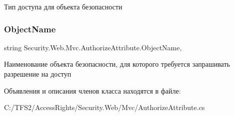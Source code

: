 Тип доступа для объекта безопасности 

\mbox{\label{class_security_1_1_web_1_1_mvc_1_1_authorize_attribute_a40d355c64a1d66cbab8b54f1fb67ad4f}} 
\subsubsection{\texorpdfstring{Object\+Name}{ObjectName}}
{\footnotesize\ttfamily string Security.\+Web.\+Mvc.\+Authorize\+Attribute.\+Object\+Name\hspace{0.3cm}{\ttfamily [get]}, {\ttfamily [set]}}



Наименование объекта безопасности, для которого требуется запрашивать разрешение на доступ 



Объявления и описания членов класса находятся в файле\+:\begin{DoxyCompactItemize}
\item 
C\+:/\+T\+F\+S2/\+Access\+Rights/\+Security.\+Web/\+Mvc/Authorize\+Attribute.\+cs\end{DoxyCompactItemize}
